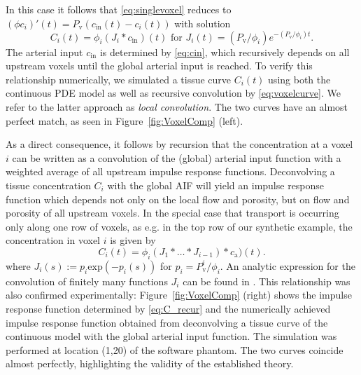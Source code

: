 \documentclass[journal,twocolumn]{IEEEtran}
\newcommand{\ca}{c_\mathrm{a}}
\newcommand{\Perfv}{P_{\mathrm{v}}}
\begin{document}
	In this case it follows that \eqref{eq:singlevoxel} reduces to $(\phi c_i)'(t) = \Perfv (c_\mathrm{in}(t) - c_i(t))$ 
	with solution
	\begin{equation}\label{eq:voxelcurve}
		C_i(t) = \phi_i(J_i*c_{\mathrm{in}})(t)
			\text{ for } J_i(t)=(\Perfv/\phi_i)e^{- (\Perfv/\phi_i)t}.
	\end{equation}
	The arterial input $c_{\mathrm{in}}$ is determined by \eqref{eq:cin}, which recursively depends on all upstream voxels until the global arterial input is reached.
	To verify this relationship numerically, we simulated a tissue curve $C_i(t)$ using both the continuous PDE model as well as recursive convolution by \eqref{eq:voxelcurve}.
	We refer to the latter approach as \textit{local convolution}. The two curves have an almost perfect match, as seen in Figure~\ref{fig:VoxelComp} (left).	
	
	As a direct consequence, it follows by recursion that the concentration at a voxel $i$ can be written as a convolution of the (global) arterial input function with a weighted average of all upstream impulse response functions.
	Deconvolving a tissue concentration $C_i$ with the global AIF will yield an impulse response function which depends not only on the local flow and porosity, but on flow and porosity of all upstream voxels.
	In the special case that transport is occurring only along one row of voxels, as e.g. in the top row of our synthetic example, the concentration in voxel $i$ is given by
	\begin{equation}
		C_i(t) = \phi_i (J_1\ast \dots \ast J_{i-1})\ast\ca)(t).
		\label{eq:C_recur}
	\end{equation}
	where $J_i(s):=p_i\mathrm{exp}(- p_i(s))$ for $p_i=\Perfv^i/\phi_i$.
	An analytic expression for the convolution of finitely many functions $J_i$ can be found in \cite{Kordecki97}.
	This relationship was also confirmed experimentally: Figure~\ref{fig:VoxelComp} (right) shows the impulse response function determined by \eqref{eq:C_recur} and the numerically achieved impulse response function obtained from deconvolving a tissue curve of the continuous model with the global arterial input function. 
	The simulation was performed at location (1,20) of the software phantom.
	The two curves coincide almost perfectly, highlighting the validity of the established theory.
	
\end{document}
